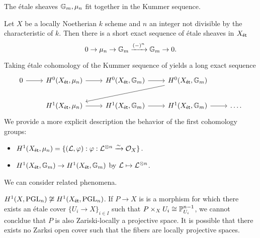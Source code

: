 The \'{e}tale sheaves $\mathbb{G}_{m},\mu_{n}$ fit together in the Kummer sequence. 
\begin{proposition}\label{prop: Kummer sequence}
    Let $X$ be a locally Noetherian $k$ scheme and $n$ an integer not divisible by the characteristic of $k$. Then there is a short exact sequence of \'{e}tale sheaves in $X_{\mathsf{\acute{e}t}}$
    $$0\to\mu_{n}\to\mathbb{G}_{m}\xrightarrow{(-)^{n}}\mathbb{G}_{m}\to0.$$
\end{proposition}
Taking \'{e}tale cohomology of the Kummer sequence of  yields a long exact sequence 
$$%
\begin{tikzcd}
	0 & {H^{0}(X_{\et},\mu_{n})} & {H^{0}(X_{\et},\GG_{m})} & {H^{0}(X_{\et},\GG_{m})} \\
	& {H^{1}(X_{\et},\mu_{n})} & {H^{1}(X_{\et},\GG_{m})} & {H^{1}(X_{\et},\GG_{m})} & {\dots.}
	\arrow[from=1-1, to=1-2]
	\arrow[from=1-2, to=1-3]
	\arrow[from=1-3, to=1-4]
	\arrow[from=1-4, to=2-2]
	\arrow[from=2-2, to=2-3]
	\arrow[from=2-3, to=2-4]
	\arrow[from=2-4, to=2-5]
\end{tikzcd}$$
We provide a more explicit description the behavior of the first cohomology groups: 
\begin{itemize}
    \item $H^{1}(X_{\mathsf{\acute{e}t}},\mu_{n})=\{(\mathcal{L},\varphi):\varphi:\mathcal{L}^{\otimes n}\xrightarrow{\sim}\mathcal{O}_{X}\}$. 
    \item $H^{1}(X_{\mathsf{\acute{e}t}},\mathbb{G}_{m})\to H^{1}(X_{\mathsf{\acute{e}t}},\mathbb{G}_{m})$ by $\mathcal{L}\mapsto\mathcal{L}^{\otimes n}$. 
\end{itemize}
We can consider related phenomena. 
\begin{example}
    $H^{1}(X,\mathrm{PGL}_{n})\not\cong H^{1}(X_{\mathsf{\acute{e}t}},\mathrm{PGL}_{n})$. If $P\to X$ is is a morphism for which there exists an \'{e}tale cover $\{U_{i}\to X\}_{i\in I}$ such that $P\times_{X}U_{i}\cong\mathbb{P}^{n-1}_{U_{i}}$, we cannot concldue that $P$ is also Zariski-locally a projective space. It is possible that there exists no Zarksi open cover such that the fibers are locally projective spaces. 
\end{example}
